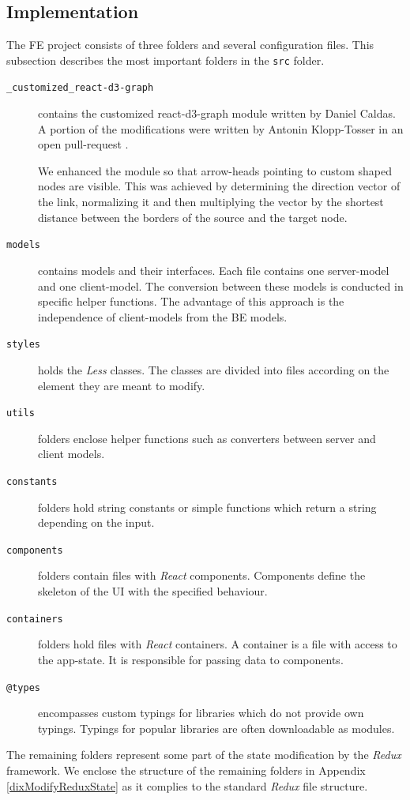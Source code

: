 \subsection{Implementation} \label{FEImplementation}
The FE project consists of three folders and several configuration files. This subsection describes the most important folders in the \texttt{src} folder. 
\begin{description}
    \item[\texttt{\_customized\_react-d3-graph}] contains the customized react-d3-graph module \cite{reactD3Graph} written by Daniel Caldas. A portion of the modifications were written by Antonin Klopp-Tosser in an open pull-request \cite{reactD3GraphPR}. 

We enhanced the module so that arrow-heads pointing to custom shaped nodes are visible. This was achieved by determining the direction vector of the link, normalizing it and then multiplying the vector by the shortest distance between the borders of the source and the target node.
    \item[\texttt{models}] contains models and their interfaces. Each file contains one server-model and one client-model. The conversion between these models is conducted in specific helper functions. The advantage of this approach is the independence of client-models from the BE models.
    \item[\texttt{styles}] holds the \textit{Less} classes. The classes are divided into files according on the element they are meant to modify.
    \item[\texttt{utils}] folders enclose helper functions such as converters between server and client models.
    \item[\texttt{constants}] folders hold string constants or simple functions which return a string depending on the input. 
    \item[\texttt{components}] folders contain files with \textit{React} components. Components define the skeleton of the UI with the specified behaviour.
    \item[\texttt{containers}] folders hold files with \textit{React} containers. A container is a file with access to the app-state. It is responsible for passing data to components. 
    \item[\texttt{@types}] encompasses custom typings for libraries which do not provide own typings. Typings for popular libraries are often downloadable as modules.
\end{description}
The remaining folders represent some part of the state modification by the \textit{Redux} framework. We enclose the structure of the remaining folders in Appendix \ref{dixModifyReduxState} as it complies to the standard \textit{Redux} file structure.
